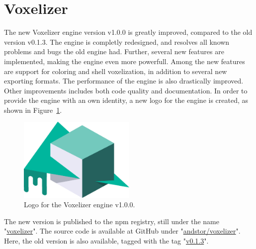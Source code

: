 \section{Voxelizer}
The new Voxelizer engine version v1.0.0 is greatly improved, compared to the old version v0.1.3. The engine is completly redesigned, and resolves all known problems and bugs the old engine had. Further, several new features are implemented, making the engine even more powerfull. Among the new features are support for coloring and shell voxelization, in addition to several new exporting formats. The performance of the engine is also drastically improved. Other improvements includes both code quality and documentation. In order to provide the engine with an own identity, a new logo for the engine is created, as shown in Figure~\ref{fig:voxelizer-logo}.
\begin{figure}[htp]
    \centering
    \includegraphics[width=0.5\textwidth]{sections/result/figures/voxelizer-logo.eps}
    \caption{Logo for the Voxelizer engine v1.0.0.}
    \label{fig:voxelizer-logo}
\end{figure}

The new version is published to the npm registry, still under the name "\href{https://npmjs.org/package/voxelizer}{voxelizer}". The source code is available at GitHub under "\href{https://github.com/andstor/voxelizer}{andstor/voxelizer}". Here, the old version is also available, tagged with the tag "\href{https://github.com/andstor/voxelizer/tree/v0.1.3}{v0.1.3}".

